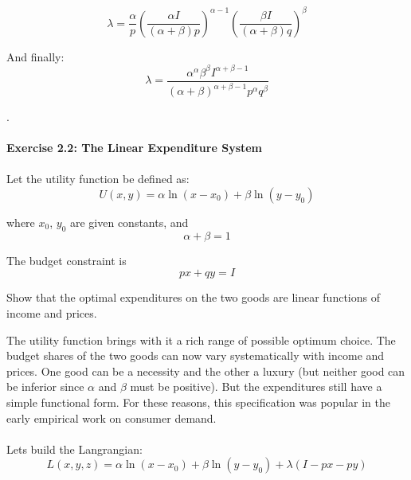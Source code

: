 \documentclass{article}
\begin{document}
  \begin{equation}
    \lambda = \frac{\alpha}{p} \left( \frac{\alpha I}{(\alpha + \beta)p} \right)^{\alpha - 1} \left( \frac{\beta I}{(\alpha + \beta)q} \right)^\beta
  \end{equation}

And finally:
 \begin{equation}
    \lambda = \frac{\alpha^\alpha \beta^\beta I^{\alpha + \beta - 1}}{(\alpha + \beta)^{\alpha + \beta - 1}p^\alpha q^\beta}
  \end{equation}

.\newline

\paragraph{Exercise 2.2: The Linear Expenditure System}

\paragraph{}

Let the utility function be defined as:
\begin{equation}
  U(x, y) = \alpha \ln (x - x_0) + \beta \ln (y - y_0)
\end{equation}

where $x_0$, $y_0$ are given constants, and
\begin{equation}\label{res}
  \alpha + \beta = 1
\end{equation}

The budget constraint is
  \begin{equation}
    px + qy = I
  \end{equation}

Show that the optimal expenditures on the two goods are linear functions of income and prices.

The utility function brings with it a rich range of possible optimum choice. The budget shares of the two goods can now vary systematically with income and prices. One good can be a necessity and the other a luxury (but neither good can be inferior since $\alpha$ and $\beta$ must be positive). But the expenditures still have a simple functional form. For these reasons, this specification was popular in the early empirical work on consumer demand.

\paragraph{}
Lets build the Langrangian:
\begin{equation}
  L(x, y, z) = \alpha \ln (x - x_0) + \beta \ln (y - y_0) + \lambda (I - px - py)
\end{equation}
\end{document}
